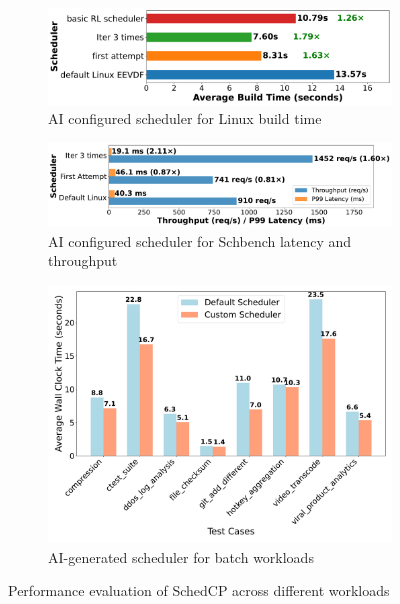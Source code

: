 \documentclass[preprint]{article}
\newcommand{\sys}{SchedCP\xspace}
\begin{document}
\begin{figure}[h]
\centering
\begin{minipage}{0.48\textwidth}
    \begin{subfigure}[b]{\textwidth}
        \centering
        \includegraphics[width=\textwidth]{sections/Linux_build_benchmark_results.pdf}
        \caption{AI configured scheduler for Linux build time}
        \label{fig:performance-comparison}
    \end{subfigure}
    \vspace{0.3cm}
    \begin{subfigure}[b]{\textwidth}
        \centering
        \includegraphics[width=\textwidth]{sections/schbench_performance_comparison.pdf}
        \caption{AI configured scheduler for Schbench latency and throughput}
        \label{fig:schbench-comparison}
    \end{subfigure}
\end{minipage}
\hfill
\begin{minipage}{0.48\textwidth}
    \begin{subfigure}[b]{\textwidth}
        \centering
        \includegraphics[width=\textwidth]{sections/scheduler_performance_comparison.pdf}
        \caption{AI-generated scheduler for batch workloads}
        \label{fig:batch-performance}
    \end{subfigure}
\end{minipage}
\caption{Performance evaluation of \sys across different workloads}
\label{fig:combined-performance}
\end{figure}
\end{document}
